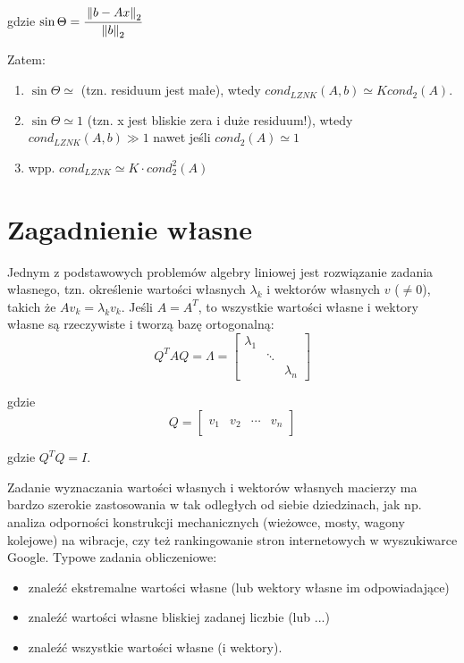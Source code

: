 \documentclass[hidelinks,a4paper,fleqn,oneside]{book}
\newcommand{\norm}[1]{\left\lVert#1\right\rVert}
\begin{document}
gdzie $\sin{\Theta} = \cfrac{\norm{b - Ax}_2}{\norm{b}_2}$

Zatem:

\begin{enumerate}
	\item $\sin\Theta \simeq$ (tzn. residuum jest małe), wtedy $cond_{LZNK}(A, b) \simeq K cond_2(A)$.
	      	
	\item $\sin\Theta \simeq 1$ (tzn. x jest bliskie zera i duże residuum!), wtedy $cond_{LZNK}(A, b)\gg 1$ nawet jeśli $cond_2(A) \simeq 1$
	      	
	\item wpp. $cond_{LZNK} \simeq K \cdot cond_2^2(A)$
\end{enumerate}

\section{Zagadnienie własne}
Jednym z podstawowych problemów algebry liniowej jest rozwiązanie zadania własnego, tzn. określenie wartości własnych $\lambda_k$ i wektorów własnych $v$ ($\neq 0$), takich że $Av_k = \lambda_k v_k$. Jeśli $A = A^T$, to wszystkie wartości własne i wektory własne są rzeczywiste i tworzą bazę ortogonalną:
\[
	Q^TAQ = \Lambda = \left[\begin{array}{ccc}
	\lambda_1 &  & \\ 
	&  \ddots & \\ 
	&  & \lambda_n
	\end{array}\right]
\]

gdzie
\[
	Q = \left[ \begin{array}{c|c|c|c} & & & \\ v_1 & v_2 & \cdots & v_n \\ & & & \end{array} \right]
\]

gdzie $Q^TQ = I$.

Zadanie wyznaczania wartości własnych i wektorów własnych macierzy ma bardzo szerokie zastosowania w tak odległych od siebie dziedzinach, jak np. analiza odporności konstrukcji mechanicznych (wieżowce, mosty, wagony kolejowe) na wibracje, czy też rankingowanie stron internetowych w wyszukiwarce Google. Typowe zadania obliczeniowe:

\begin{itemize}
	\item znaleźć ekstremalne wartości własne (lub wektory własne im odpowiadające)
	\item znaleźć wartości własne bliskiej zadanej liczbie (lub ...)
	\item znaleźć wszystkie wartości własne (i wektory).
\end{itemize}
\end{document}
